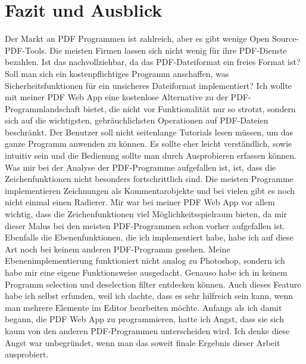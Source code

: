 \chapter{Fazit und Ausblick}
Der Markt an PDF Programmen ist zahlreich, aber es gibt wenige Open Source-PDF-Tools. Die meisten Firmen lassen sich nicht wenig für ihre PDF-Dienste bezahlen. Ist das nachvollziehbar, da das PDF-Dateiformat ein freies Format ist? Soll man sich ein kostenpflichtiges Programm anschaffen, was Sicherheitsfunktionen für ein unsicheres Dateiformat implementiert? Ich wollte mit meiner PDF Web App eine kostenlose Alternative zu der PDF-Programmlandschaft bietet, die nicht vor Funktionalität nur so strotzt, sondern sich auf die wichtigsten, gebräuchlichsten Operationen auf PDF-Dateien beschränkt. Der Benutzer soll nicht seitenlange Tutorials lesen müssen, um das ganze Programm anwenden zu können. Es sollte eher leicht verständlich, sowie intuitiv sein und die Bedienung sollte man durch Ausprobieren erfassen können. Was mir bei der Analyse der PDF-Programme aufgefallen ist, ist, dass die Zeichenfunktionen nicht besonders fortschrittlich sind. Die meisten Programme implementieren Zeichnungen als Kommentarobjekte und bei vielen gibt es noch nicht einmal einen Radierer. Mir war bei meiner PDF Web App vor allem wichtig, dass die Zeichenfunktionen viel Möglichkeitsspielraum bieten, da mir dieser Malus bei den meisten PDF-Programmen schon vorher aufgefallen ist. Ebenfalls die Ebenenfunktionen, die ich implementiert habe, habe ich auf diese Art noch bei keinem anderen PDF-Programm gesehen. Meine Ebenenimplementierung funktioniert nicht analog zu Photoshop, sondern ich habe mir eine eigene Funktionsweise ausgedacht. Genauso habe ich in keinem Programm selection und deselection filter entdecken können. Auch dieses Feature habe ich selbst erfunden, weil ich dachte, dass es sehr hilfreich sein kann, wenn man mehrere Elemente im Editor bearbeiten möchte. Anfangs als ich damit begann, die PDF Web App zu programmieren, hatte ich Angst, dass sie sich kaum von den anderen PDF-Programmen unterscheiden wird. Ich denke diese Angst war unbegründet, wenn man das soweit finale Ergebnis dieser Arbeit ausprobiert.
\par
